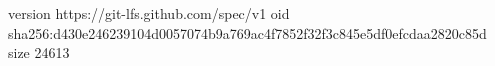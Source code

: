 version https://git-lfs.github.com/spec/v1
oid sha256:d430e246239104d0057074b9a769ac4f7852f32f3c845e5df0efcdaa2820c85d
size 24613
